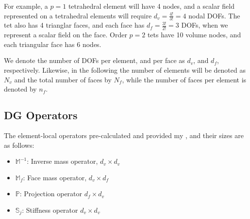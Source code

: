 \documentclass[11pt]{article}
\begin{document}
For example, a $p=1$ tetrahedral element will have 4 nodes, and a scalar field represented on a tetrahedral elements will require $d_v = \frac{4!}{3!} = 4$ nodal DOFs. The tet also has 4 trianglar faces, and each face has $d_f = \frac{3!}{2!} = 3$ DOFs, when we represent a scalar field on the face. Order $p=2$ tets have 10 volume nodes, and each triangular face has 6 nodes. 

We denote the number of DOFs per element, and per face as $d_v$, and $d_f$, respectively. Likewise, in the following the number of elements will be denoted as $N_v$ and the total number of faces by $N_f$, while the number of faces per element is denoted by $n_f$.

\subsection{\ceesdcode{} DG Operators}

The element-local operators pre-calculated and provided my \ceesdcode{}, and their sizes are as follows:  
\begin{itemize}
\item $\mathbb{M}^{-1}$: Inverse mass operator, $d_v \times d_v$
\item $\mathbb{M}_f$: Face mass operator, $d_v \times d_f$
\item $\mathbb{P}$: Projection operator $d_f \times d_v$
\item $\mathbb{S}_j$: Stiffness operator $d_v \times d_v$
\end{itemize}
\end{document}

